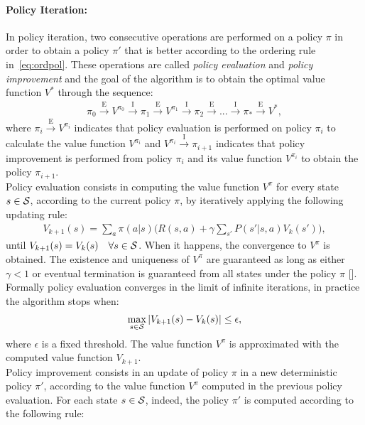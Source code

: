 \paragraph{Policy Iteration:}
In policy iteration, two consecutive operations are performed on a policy $\pi$ in order to obtain a policy $\pi'$ that is better according to the ordering rule in~\eqref{eq:ordpol}. These operations are called \emph{policy evaluation} and \emph{policy improvement} and the goal of the algorithm is to obtain the optimal value function $V^{*}$ through the sequence:
\begin{align}
\pi_{0} \xrightarrow{\text{E}} V^{\pi_{0}} \xrightarrow{\text{I}} \pi_{1} \xrightarrow{\text{E}} V^{\pi_{1}} \xrightarrow{\text{I}} \pi_{2} \xrightarrow{\text{E}} ... \xrightarrow{\text{I}} \pi_{*} \xrightarrow{\text{E}} V^{*},
\end{align}
where $\pi_{i} \xrightarrow{\text{E}} V^{\pi_{i}}$ indicates that policy evaluation is performed on policy $\pi_{i}$ to calculate the value function $V^{\pi_{i}}$ and $V^{\pi_{i}} \xrightarrow{\text{I}} \pi_{i+1}$ indicates that policy improvement is performed from policy $\pi_{i}$ and its value function $V^{\pi_{i}}$ to obtain the policy $\pi_{i+1}$.\\
\newline
Policy evaluation consists in computing the value function $V^{\pi}$ for every state $s \in \mathcal{S}$, according to the current policy $\pi$, by iteratively applying the following updating rule:
\begin{align} V_{k+1}(s) = \sum_{a}\pi(a|s) \Big( R(s,a) + \gamma \sum_{s'}P(s'|s,a) V_{k}(s') \Big), \label{eq:updrule} \end{align}
until $V_{k+1}(s) = V_{k}(s) \quad \forall s \in \mathcal{S}$. When it happens, the convergence to $V^{\pi}$ is obtained. The existence and uniqueness of $V^{\pi}$ are guaranteed as long as either $\gamma<1$ or eventual termination is guaranteed from all states under the policy $\pi$ [\cite{sutton2018reinforcement}]. Formally policy evaluation converges in the limit of infinite iterations, in practice the algorithm stops when:
\begin{align}
	\max_{s \in \mathcal{S}}|V_{k+1}(s) - V_{k}(s)| \leq \epsilon, \label{eq:stopcond}
\end{align}
where $\epsilon$ is a fixed threshold. The value function $V^{\pi}$ is approximated with the computed value function $V_{k+1}$.\\
\newline
Policy improvement consists in an update of policy $\pi$ in a new deterministic policy $\pi'$, according to the value function $V^{\pi}$ computed in the previous policy evaluation. For each state $s \in \mathcal{S}$, indeed, the policy $\pi'$ is computed according to the following rule:

